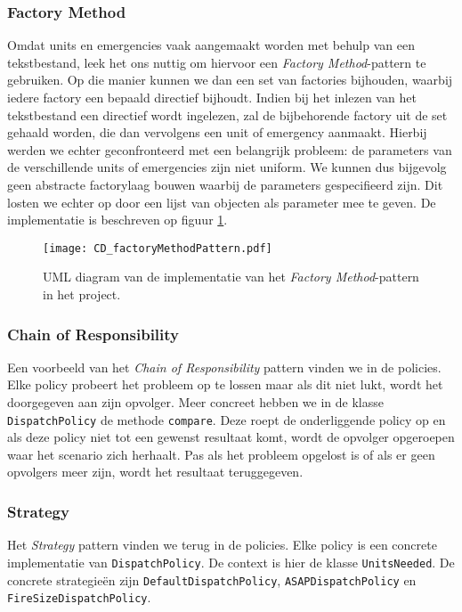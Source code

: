 \subsubsection{Factory Method}
Omdat units en emergencies vaak aangemaakt worden met behulp van een tekstbestand, leek het ons nuttig om hiervoor een \textit{Factory Method}-pattern te gebruiken. Op die manier kunnen we dan een set van factories bijhouden, waarbij iedere factory een bepaald directief bijhoudt. Indien bij het inlezen van het tekstbestand een directief wordt ingelezen, zal de bijbehorende factory uit de set gehaald worden, die dan vervolgens een unit of emergency aanmaakt. Hierbij werden we echter geconfronteerd met een belangrijk probleem: de parameters van de verschillende units of emergencies zijn niet uniform. We kunnen dus bijgevolg geen abstracte factorylaag bouwen waarbij de parameters gespecifieerd zijn. Dit losten we echter op door een lijst van objecten als parameter mee te geven. De implementatie is beschreven op figuur \ref{fig:factoryMethodPattern}.
\begin{figure}[h!]
\texttt{[image: CD\_factoryMethodPattern.pdf]}
\caption{UML diagram van de implementatie van het \textit{Factory Method}-pattern in het project.}
\label{fig:factoryMethodPattern}
\end{figure}
\subsubsection{Chain of Responsibility}
Een voorbeeld van het \textit{Chain of Responsibility} pattern vinden we in de policies. Elke policy probeert het probleem op te lossen maar als dit niet lukt, wordt het doorgegeven aan zijn opvolger. Meer concreet hebben we in de klasse \texttt{DispatchPolicy} de methode \texttt{compare}. Deze roept de onderliggende policy op en als deze policy niet tot een gewenst resultaat komt, wordt de opvolger opgeroepen waar het scenario zich herhaalt. Pas als het probleem opgelost is of als er geen opvolgers meer zijn, wordt het resultaat teruggegeven.
\subsubsection{Strategy}
Het \textit{Strategy} pattern vinden we terug in de policies. Elke policy is een concrete implementatie van \texttt{DispatchPolicy}. De context is hier de klasse \texttt{UnitsNeeded}. De concrete strategie\"en zijn \texttt{DefaultDispatchPolicy}, \texttt{ASAPDispatchPolicy} en \texttt{FireSizeDispatchPolicy}.
